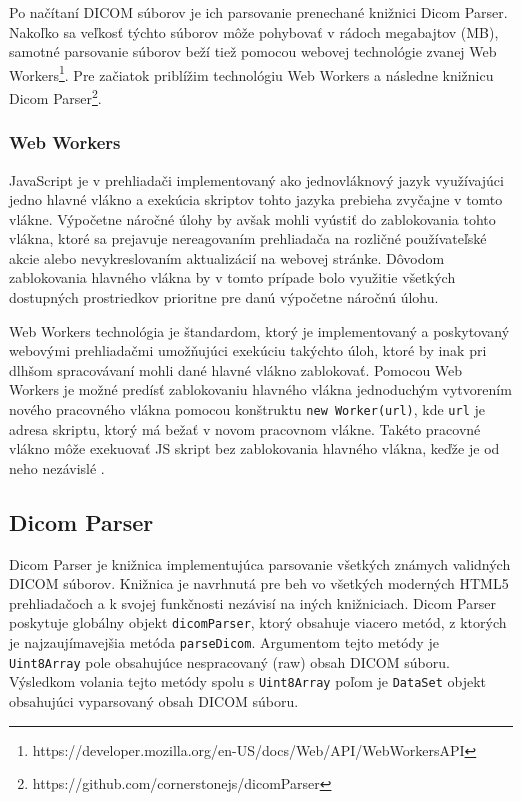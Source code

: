 Po načítaní DICOM súborov je ich parsovanie prenechané knižnici Dicom Parser. Nakoľko sa veľkosť týchto súborov môže pohybovať v rádoch megabajtov (MB), samotné parsovanie súborov beží tiež pomocou webovej technológie zvanej Web Workers\footnote{https://developer.mozilla.org/en-US/docs/Web/API/Web\textunderscore Workers\textunderscore API}. Pre začiatok priblížim technológiu Web Workers a následne knižnicu Dicom Parser\footnote{https://github.com/cornerstonejs/dicomParser}.

\subsubsection {Web Workers}
JavaScript je v prehliadači implementovaný ako jednovláknový jazyk využívajúci jedno hlavné vlákno a exekúcia skriptov tohto jazyka prebieha zvyčajne v tomto vlákne. Výpočetne náročné úlohy by avšak mohli vyústiť do zablokovania tohto vlákna, ktoré sa prejavuje nereagovaním prehliadača na rozličné používateľské akcie alebo nevykreslovaním aktualizácií na webovej stránke. Dôvodom zablokovania hlavného vlákna by v tomto prípade bolo využitie všetkých dostupných prostriedkov prioritne pre danú výpočetne náročnú úlohu.

Web Workers technológia je štandardom, ktorý je implementovaný a poskytovaný webovými prehliadačmi umožňujúci exekúciu takýchto úloh, ktoré by inak pri dlhšom spracovávaní mohli dané hlavné vlákno zablokovať. Pomocou Web Workers je možné predísť zablokovaniu hlavného vlákna jednoduchým vytvorením nového pracovného vlákna pomocou konštruktu \texttt{new Worker(url)}, kde \texttt{url} je adresa skriptu, ktorý má bežať v novom pracovnom vlákne. Takéto pracovné vlákno môže exekuovať JS skript bez zablokovania hlavného vlákna, keďže je od neho nezávislé \cite{using_web_workers}.

\subsection {Dicom Parser}
Dicom Parser je knižnica implementujúca parsovanie všetkých známych validných DICOM súborov. Knižnica je navrhnutá pre beh vo všetkých moderných HTML5 prehliadačoch a k svojej funkčnosti nezávisí na iných knižniciach. Dicom Parser poskytuje globálny objekt \texttt{dicomParser}, ktorý obsahuje viacero metód, z ktorých je najzaujímavejšia metóda \texttt{parseDicom}. Argumentom tejto metódy je \texttt{Uint8Array} pole obsahujúce nespracovaný (raw) obsah DICOM súboru. Výsledkom volania tejto metódy spolu s \texttt{Uint8Array} poľom je \texttt{DataSet} objekt obsahujúci vyparsovaný obsah DICOM súboru.

